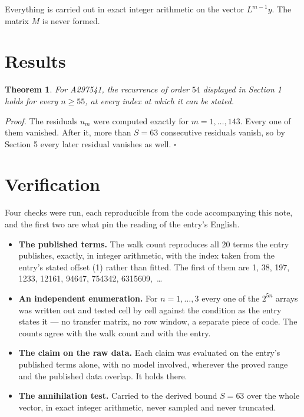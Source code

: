 \documentclass[11pt]{article}
\newtheorem{theorem}{Theorem}
\theoremstyle{definition}
\begin{document}
Everything is carried out in exact integer arithmetic on the vector $L^{m-1}y$. The matrix $M$ is never formed.

\section{Results}

\begin{theorem} For A297541, the recurrence of order $54$ displayed in Section 1 holds for every $n \ge 55$, at every index at which it can be stated.\end{theorem}

{\itshape Proof.} The residuals $u_m$ were computed exactly for $m = 1,\dots,143$. Every one of them vanished. After it, more than $S = 63$ consecutive residuals vanish, so by Section 5 every later residual vanishes as well. $\square$

\section{Verification}

Four checks were run, each reproducible from the code accompanying this note, and the first two are what pin the reading of the entry's English.

\begin{itemize}

\item {\bfseries The published terms.} The walk count reproduces all 20 terms the entry publishes, exactly, in integer arithmetic, with the index taken from the entry's stated offset (1) rather than fitted. The first of them are 1, 38, 197, 1233, 12161, 94647, 754342, 6315609,~\dots

\item {\bfseries An independent enumeration.} For $n = 1,\dots,3$ every one of the $2^{5n}$ arrays was written out and tested cell by cell against the condition as the entry states it --- no transfer matrix, no row window, a separate piece of code. The counts agree with the walk count and with the entry.

\item {\bfseries The claim on the raw data.} Each claim was evaluated on the entry's published terms alone, with no model involved, wherever the proved range and the published data overlap. It holds there.

\item {\bfseries The annihilation test.} Carried to the derived bound $S = 63$ over the whole vector, in exact integer arithmetic, never sampled and never truncated.

\end{itemize}
\end{document}
